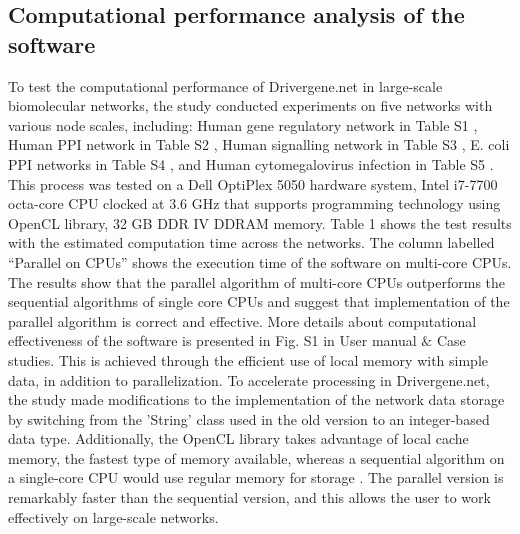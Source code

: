 \documentclass[5p,,preprint,12pt]{elsarticle}
\begin{document}
\subsection{Computational performance analysis of the software} 
To test the computational performance of Drivergene.net in large-scale biomolecular networks, the study conducted experiments on five networks with various node scales, including: Human gene regulatory network in Table S1 \cite{35}, Human PPI network in Table S2 \cite{36}, Human signalling network in Table S3 \cite{37}, E. coli PPI networks in Table S4 \cite{38}, and Human cytomegalovirus infection in Table S5 \cite{39,40}. This process was tested on a Dell OptiPlex 5050 hardware system, Intel i7-7700 octa-core CPU clocked at 3.6 GHz that supports programming technology using OpenCL library, 32 GB DDR IV DDRAM memory. Table 1 shows the test results with the estimated computation time across the networks. The column labelled “Parallel on CPUs” shows the execution time of the software on multi-core CPUs. The results show that the parallel algorithm of multi-core CPUs outperforms the sequential algorithms of single core CPUs and suggest that implementation of the parallel algorithm is correct and effective. More details about computational effectiveness of the software is presented in Fig. S1 in User manual $\&$ Case studies. This is achieved through the efficient use of local memory with simple data, in addition to parallelization. To accelerate processing in Drivergene.net, the study made modifications to the implementation of the network data storage by switching from the 'String' class used in the old version to an integer-based data type. Additionally, the OpenCL library takes advantage of local cache memory, the fastest type of memory available, whereas a sequential algorithm on a single-core CPU would use regular memory for storage \cite{41}. The parallel version is remarkably faster than the sequential version, and this allows the user to work effectively on large-scale networks. 
\end{document}
